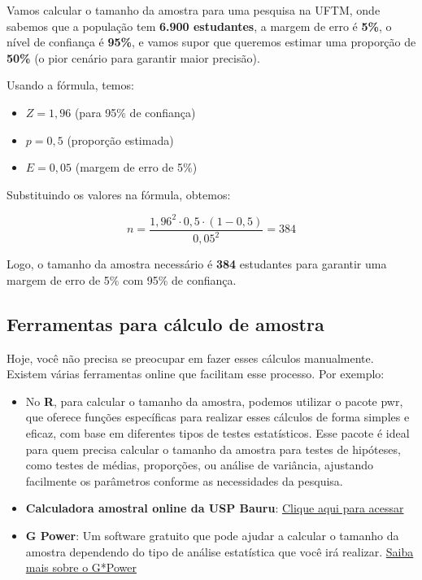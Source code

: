 \documentclass[
]{book}
\providecommand{\tightlist}{%
  \setlength{\itemsep}{0pt}\setlength{\parskip}{0pt}}
\begin{document}
Vamos calcular o tamanho da amostra para uma pesquisa na UFTM, onde sabemos que a população tem \textbf{6.900 estudantes}, a margem de erro é \textbf{5\%}, o nível de confiança é \textbf{95\%}, e vamos supor que queremos estimar uma proporção de \textbf{50\%} (o pior cenário para garantir maior precisão).

Usando a fórmula, temos:

\begin{itemize}
\tightlist
\item
  \(Z = 1,96\) (para 95\% de confiança)
\item
  \(p = 0,5\) (proporção estimada)
\item
  \(E = 0,05\) (margem de erro de 5\%)
\end{itemize}

Substituindo os valores na fórmula, obtemos:

\[
n = \frac{{1,96^2 \cdot 0,5 \cdot (1 - 0,5)}}{{0,05^2}} = 384
\]

Logo, o tamanho da amostra necessário é \textbf{384} estudantes para garantir uma margem de erro de 5\% com 95\% de confiança.

\subsection{Ferramentas para cálculo de amostra}\label{ferramentas-para-cuxe1lculo-de-amostra}

Hoje, você não precisa se preocupar em fazer esses cálculos manualmente. Existem várias ferramentas online que facilitam esse processo. Por exemplo:

\begin{itemize}
\tightlist
\item
  No \textbf{R}, para calcular o tamanho da amostra, podemos utilizar o pacote pwr, que oferece funções específicas para realizar esses cálculos de forma simples e eficaz, com base em diferentes tipos de testes estatísticos. Esse pacote é ideal para quem precisa calcular o tamanho da amostra para testes de hipóteses, como testes de médias, proporções, ou análise de variância, ajustando facilmente os parâmetros conforme as necessidades da pesquisa.
\item
  \textbf{Calculadora amostral online da USP Bauru}: \href{http://estatistica.bauru.usp.br/calculoamostral/}{Clique aqui para acessar}
\item
  \textbf{G Power}: Um software gratuito que pode ajudar a calcular o tamanho da amostra dependendo do tipo de análise estatística que você irá realizar. \href{https://www.gpower.hhu.de/en.html}{Saiba mais sobre o G*Power}
\end{itemize}
\end{document}

